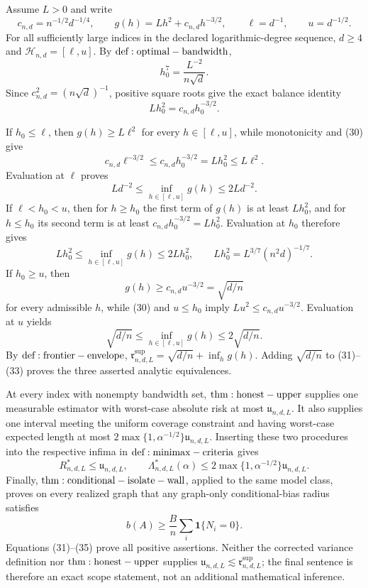 Assume \(L>0\) and write
\[
 c_{n,d}=n^{-1/2}d^{-1/4},\qquad
 g(h)=Lh^2+c_{n,d}h^{-3/2},\qquad
 \ell=d^{-1},\qquad u=d^{-1/2}.
\tag{29}
\]
For all sufficiently large indices in the declared logarithmic-degree sequence, \(d\ge4\) and \(\mathcal H_{n,d}=[\ell,u]\).  By \({\rm def:optimal-bandwidth}\),
\[
 h_0^7=\frac{L^{-2}}{n\sqrt d}.
\]
Since \(c_{n,d}^2=(n\sqrt d)^{-1}\), positive square roots give the exact balance identity
\[
 Lh_0^2=c_{n,d}h_0^{-3/2}.
\tag{30}
\]

If \(h_0\le\ell\), then \(g(h)\ge L\ell^2\) for every \(h\in[\ell,u]\), while monotonicity and (30) give
\[
 c_{n,d}\ell^{-3/2}\le c_{n,d}h_0^{-3/2}=Lh_0^2\le L\ell^2.
\]
Evaluation at \(\ell\) proves
\[
 Ld^{-2}\le\inf_{h\in[\ell,u]}g(h)\le2Ld^{-2}.
\tag{31}
\]
If \(\ell<h_0<u\), then for \(h\ge h_0\) the first term of \(g(h)\) is at least \(Lh_0^2\), and for \(h\le h_0\) its second term is at least \(c_{n,d}h_0^{-3/2}=Lh_0^2\).  Evaluation at \(h_0\) therefore gives
\[
 Lh_0^2\le\inf_{h\in[\ell,u]}g(h)\le2Lh_0^2,
 \qquad
 Lh_0^2=L^{3/7}(n^2d)^{-1/7}.
\tag{32}
\]
If \(h_0\ge u\), then
\[
 g(h)\ge c_{n,d}u^{-3/2}=\sqrt{d/n}
\]
for every admissible \(h\), while (30) and \(u\le h_0\) imply \(Lu^2\le c_{n,d}u^{-3/2}\).  Evaluation at \(u\) yields
\[
 \sqrt{d/n}\le\inf_{h\in[\ell,u]}g(h)\le2\sqrt{d/n}.
\tag{33}
\]
By \({\rm def:frontier-envelope}\), \(\mathfrak r^{\mathrm{sup}}_{n,d,L}=\sqrt{d/n}+\inf_hg(h)\).  Adding \(\sqrt{d/n}\) to (31)--(33) proves the three asserted analytic equivalences.

At every index with nonempty bandwidth set, \({\rm thm:honest-upper}\) supplies one measurable estimator with worst-case absolute risk at most \(\mathfrak u_{n,d,L}\).  It also supplies one interval meeting the uniform coverage constraint and having worst-case expected length at most \(2\max\{1,\alpha^{-1/2}\}\mathfrak u_{n,d,L}\).  Inserting these two procedures into the respective infima in \({\rm def:minimax-criteria}\) gives
\[
 R^*_{n,d,L}\le\mathfrak u_{n,d,L},
 \qquad
 \Lambda^*_{n,d,L}(\alpha)
 \le2\max\{1,\alpha^{-1/2}\}\mathfrak u_{n,d,L}.
\tag{34}
\]
Finally, \({\rm thm:conditional-isolate-wall}\), applied to the same model class, proves on every realized graph that any graph-only conditional-bias radius satisfies
\[
 b(A)\ge\frac Bn\sum_i\mathbf1\{N_i=0\}.
\tag{35}
\]
Equations (31)--(35) prove all positive assertions.  Neither the corrected variance definition nor \({\rm thm:honest-upper}\) supplies \(\mathfrak u_{n,d,L}\lesssim\mathfrak r^{\mathrm{sup}}_{n,d,L}\); the final sentence is therefore an exact scope statement, not an additional mathematical inference.